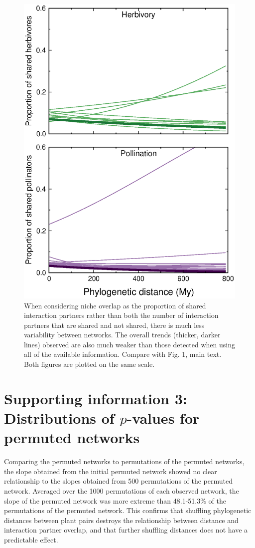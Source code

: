 \documentclass[12pt]{article}
\begin{document}
\begin{spacing}{1.5}
    \begin{figure}[!h]
        \begin{center}
          \centerline{\includegraphics*[width=.75\textwidth]{Figures/dataplots/proportion_regression_lines_full_color.eps}}
        \end{center}
         \caption{\small When considering niche overlap as the proportion of shared interaction partners rather than both the number of interaction partners that are shared and not shared, there is much less variability between networks. The overall trends (thicker, darker lines) observed are also much weaker than those detected when using all of the available information. Compare with Fig. 1, main text. Both figures are plotted on the same scale.
         }
        \label{lineplot}
      \end{figure}



\clearpage

\section*{Supporting information 3: Distributions of $p$-values for permuted networks}


    Comparing the permuted networks to permutations of the permuted networks, the slope obtained from the initial permuted network showed no clear relationship to the slopes obtained from 500 permutations of the permuted network. Averaged over the 1000 permutations of each observed network, the slope of the permuted network was more extreme than 48.1-51.3\% of the permutations of the permuted network. This confirms that shuffling phylogenetic distances between plant pairs destroys the relationship between distance and interaction partner overlap, and that further shuffling distances does not have a predictable effect.



\end{spacing}
\end{document}
